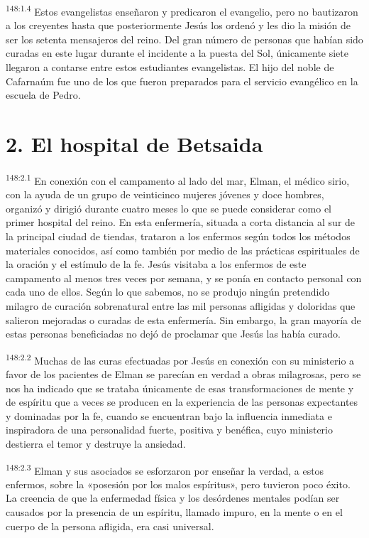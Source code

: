 \par 
\textsuperscript{148:1.4} Estos evangelistas enseñaron y predicaron el evangelio, pero no bautizaron a los creyentes hasta que posteriormente Jesús los ordenó y les dio la misión de ser los setenta mensajeros del reino. Del gran número de personas que habían sido curadas en este lugar durante el incidente a la puesta del Sol, únicamente siete llegaron a contarse entre estos estudiantes evangelistas. El hijo del noble de Cafarnaúm fue uno de los que fueron preparados para el servicio evangélico en la escuela de Pedro.

\section*{2. El hospital de Betsaida}
\par 
\textsuperscript{148:2.1} En conexión con el campamento al lado del mar, Elman, el médico sirio, con la ayuda de un grupo de veinticinco mujeres jóvenes y doce hombres, organizó y dirigió durante cuatro meses lo que se puede considerar como el primer hospital del reino. En esta enfermería, situada a corta distancia al sur de la principal ciudad de tiendas, trataron a los enfermos según todos los métodos materiales conocidos, así como también por medio de las prácticas espirituales de la oración y el estímulo de la fe. Jesús visitaba a los enfermos de este campamento al menos tres veces por semana, y se ponía en contacto personal con cada uno de ellos. Según lo que sabemos, no se produjo ningún pretendido milagro de curación sobrenatural entre las mil personas afligidas y doloridas que salieron mejoradas o curadas de esta enfermería. Sin embargo, la gran mayoría de estas personas beneficiadas no dejó de proclamar que Jesús las había curado.

\par 
\textsuperscript{148:2.2} Muchas de las curas efectuadas por Jesús en conexión con su ministerio a favor de los pacientes de Elman se parecían en verdad a obras milagrosas, pero se nos ha indicado que se trataba únicamente de esas transformaciones de mente y de espíritu que a veces se producen en la experiencia de las personas expectantes y dominadas por la fe, cuando se encuentran bajo la influencia inmediata e inspiradora de una personalidad fuerte, positiva y benéfica, cuyo ministerio destierra el temor y destruye la ansiedad.

\par 
\textsuperscript{148:2.3} Elman y sus asociados se esforzaron por enseñar la verdad, a estos enfermos, sobre la «posesión por los malos espíritus», pero tuvieron poco éxito. La creencia de que la enfermedad física y los desórdenes mentales podían ser causados por la presencia de un espíritu, llamado impuro, en la mente o en el cuerpo de la persona afligida, era casi universal.


